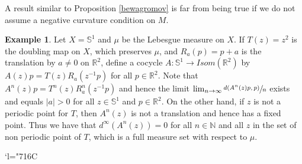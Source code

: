 \documentclass[11pt]{article}
\newcommand{\Changelback}{\mathcode`l="716C}
\theoremstyle{plain}
\theoremstyle{definition}
\newtheorem{ej}[teo]{Example}
\newcommand{\NN}{\mathbb{N}}
\newcommand{\RR}{\mathbb{R}}
\newcommand{\Isom}{\mathit{Isom}}
\newcommand{\ccl}[3]{#1^{#2}(#3)}
\begin{document}
A result similar to Proposition \ref{bewagromov} is far from being true if we do not assume a negative curvature condition on $M$.
\begin{ej}Let $X=\mathbb{S}^1$ and $\mu$ be the Lebesgue measure on $X$. If $T(z)=z^{2}$ is the doubling map on $X$, which preserves $\mu$, and $R_{a}(p)=p+a$ is the translation by $a\neq 0$ on $\RR^{2}$, define a cocycle $A:\mathbb{S}^1 \rightarrow \Isom(\mathbb{R}^{2})$ by $A(z)p=T(z)R_{a}(z^{-1}p)$ for all $p\in \RR^2$. Note that $\ccl{A}{n}{z}p=T^{n}(z)R^{n}_{a}(z^{-1}p)$ and hence the limit
$\lim_{n \to \infty}{\sfrac{d(\ccl{A}{n}{z}p,p)}{n}}$ exists and equals $|a|>0$ for all $z\in \mathbb{S}^1$ and $p\in \RR^2$. On the other hand, if $z$ is not a periodic point for $T$, then $\ccl{A}{n}{z}$ is not a translation and hence has a fixed point. Thus we have that $d^{\infty}(\ccl{A}{n}{z})=0$ for all $n\in \NN$ and all $z$ in the set of non periodic point of $T$, which is a full measure set with respect to $\mu$.
\end{ej}

\Changelback

\end{document}
